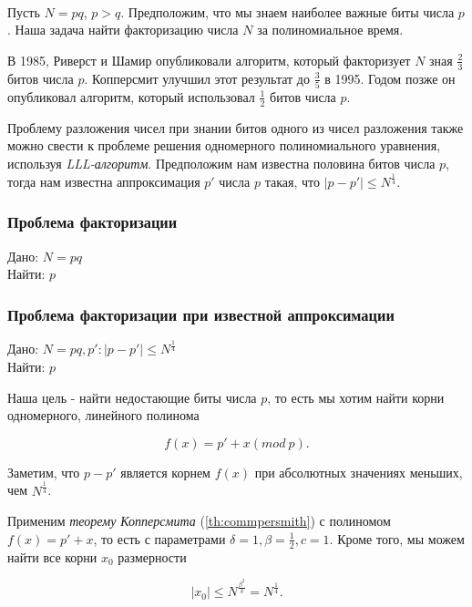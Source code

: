 \paragraph{} Пусть {$N = pq$}, {$p > q$}. Предположим, что мы знаем наиболее важные биты числа {$p$}. Наша задача найти факторизацию числа
  {$N$} за полиномиальное время.
  
  В 1985, Риверст и Шамир опубликовали алгоритм, который факторизует {$N$} зная {$\frac{2}{3}$} битов числа {$p$}. Копперсмит улучшил этот результат
  до {$\frac{3}{5}$} в 1995. Годом позже он опубликовал алгоритм, который использовал {$\frac{1}{2}$} битов числа {$p$}.
  
  Проблему разложения чисел при знании битов одного из чисел разложения также можно свести к проблеме решения одномерного полиномиального
  уравнения, используя \textit{LLL-алгоритм}. Предположим нам известна половина битов числа {$p$}, тогда нам известна аппроксимация {$p'$}
  числа {$p$} такая, что {$|p-p'| \le N^\frac{1}{4}$}.
  
  \subsubsection{Проблема факторизации}
  Дано: {$N = p q$} \\   
  Найти: {$p$}  
  
  \subsubsection{Проблема факторизации при известной аппроксимации}
  Дано: {$ N = p q, p': |p-p'| \le N^\frac{1}{4} $} \\   
  Найти: {$p$}  
  
  Наша цель - найти недостающие биты числа {$p$}, то есть мы хотим найти корни одномерного, линейного полинома
  
    \begin{equation}
      f(x) = p' + x (mod \: p).
    \end{equation}

  Заметим, что {$p-p'$} является корнем {$f(x)$} при абсолютных значениях меньших, чем {$N^\frac{1}{4}$}.
  
  Применим \textit{теорему Копперсмита} (\ref{th:commpersmith}) с полиномом {$f(x) = p' + x$}, то есть с параметрами {$\delta = 1, \beta = \frac{1}{2}, c = 1$}.
  Кроме того, мы можем найти все корни {$x_0$} размерности
  
    \begin{equation}
     |x_0| \le N^\frac{\beta^2}{\delta} = N^\frac{1}{4}.
    \end{equation}
    
